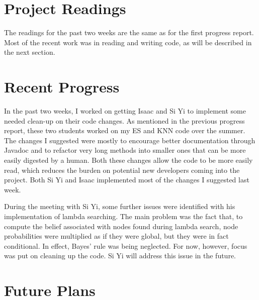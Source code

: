 \documentclass[]{article}
\begin{document}
	\section{Project Readings} \label{sec:readings}
	
	The readings for the past two weeks are the same as for the first progress report. Most of the recent work was in reading and writing code, as will be described in the next section.
	
	\section{Recent Progress} \label{sec:progress}
	
	In the past two weeks, I worked on getting Isaac and Si Yi to implement some needed clean-up on their code changes. As mentioned in the previous progress report, these two students worked on my ES and KNN code over the summer. The changes I suggested were mostly to encourage better documentation through Javadoc and to refactor very long methods into smaller ones that can be more easily digested by a human. Both these changes allow the code to be more easily read, which reduces the burden on potential new developers coming into the project. Both Si Yi and Isaac implemented most of the changes I suggested last week.
	
	During the meeting with Si Yi, some further issues were identified with his implementation of lambda searching. The main problem was the fact that, to compute the belief associated with nodes found during lambda search, node probabilities were multiplied as if they were global, but they were in fact conditional. In effect, Bayes' rule was being neglected. For now, however, focus was put on cleaning up the code. Si Yi will address this issue in the future.
	
	\section{Future Plans} \label{sec:plans}
		
\end{document}
